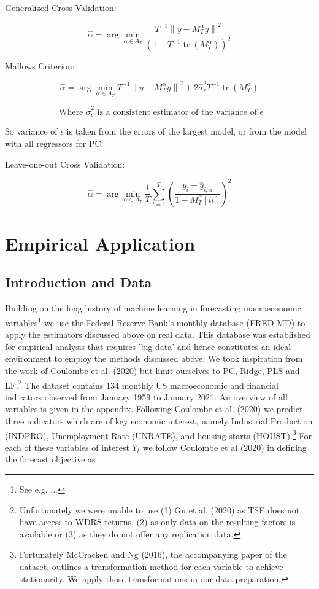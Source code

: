 Generalized Cross Validation:

\[\hat{\alpha}=\arg \min _{\alpha \in A_{T}} \frac{T^{-1}\left\|y-M_{T}^{\alpha} y\right\|^{2}}{\left(1-T^{-1} \operatorname{tr}\left(M_{T}^{\alpha}\right)\right)^{2}}\]

Mallows Criterion:

\[\hat{\alpha}=\arg \min _{\alpha \in A_{T}} T^{-1}\left\|y-M_{T}^{\alpha} y\right\|^{2}+2 \widehat{\sigma}_{\varepsilon}^{2} T^{-1} \operatorname{tr}\left(M_{T}^{\alpha}\right)\]

\[\text{ Where } \widehat{\sigma}_{\epsilon}^{2} \text{ is a consistent estimator of the variance of } \epsilon\]

So variance of $\epsilon$ is taken from the errors of the largest model, or from the model with all regressors for PC.

Leave-one-out Cross Validation:

\[\hat{\alpha}=\arg \min _{\alpha \in A_{T}} \frac{1}{T} \sum_{t=1}^{T}\left(\frac{y_{i}-\hat{y}_{i, \alpha}}{1-M_{T}^{\alpha}[ii]}\right)^{2}\]



\clearpage

\section{Empirical Application}
\subsection{Introduction and Data}
Building on the long history of machine learning in forecasting macroeconomic variables\footnote{See e.g. ...} we use the Federal Reserve Bank's monthly database (FRED-MD) to apply the estimators discussed above on real data. This database was established for empirical analysis that requires 'big data' and hence constitutes an ideal environment to employ the methods discussed above. We took inspiration from the work of Coulombe et al. (2020) but limit ourselves to PC, Ridge, PLS and LF.\footnote{Unfortunately we were unable to use (1) Gu et al. (2020) as TSE does not have access to WDRS returns, (2) as only data on the resulting factors is available or (3) as they do not offer any replication data.} 
The dataset contains 134 monthly US macroeconomic and financial indicators observed from January 1959 to January 2021. An overview of all variables is given in the appendix. 
Following Coulombe et al. (2020) we predict three indicators which are of key economic interest, namely Industrial Production (INDPRO), Unemployment Rate (UNRATE), and housing starts (HOUST).\footnote{Fortunately McCracken and Ng (2016), the accompanying paper of the dataset, outlines a transformation method for each variable to achieve stationarity. We apply those transformations in our data preparation.}
For each of these variables of interest $Y_t$ we follow Coulombe et al (2020) in defining the forecast objective as

